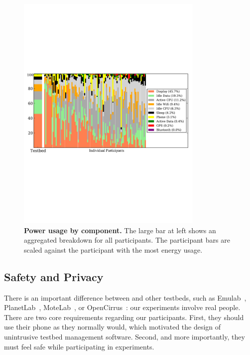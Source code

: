 \begin{figure}[t]

\centering
\includegraphics[width=0.8\textwidth]{./figures/power/breakdown/graph.pdf}

\caption{\textbf{Power usage by component.} The large bar at left shows an
aggregated breakdown for all participants. The participant bars are scaled
against the participant with the most energy usage.}

\label{figure-batteryoverview}
\end{figure}

\subsection{Safety and Privacy}

There is an important difference between \PhoneLab{} and other testbeds, such
as Emulab~\cite{white:osdi:2002}, PlanetLab~\cite{peterson:ccr:2003},
MoteLab~\cite{werner-allen:ipsn:2005}, or
OpenCirrus~\cite{avetisyan:computer:2010}: our experiments involve real
people. There are two core requirements regarding our participants. First,
they should use their phone as they normally would, which motivated the
design of unintrusive testbed management software. Second, and more
importantly, they must feel safe while participating in \PhoneLab{}
experiments.

